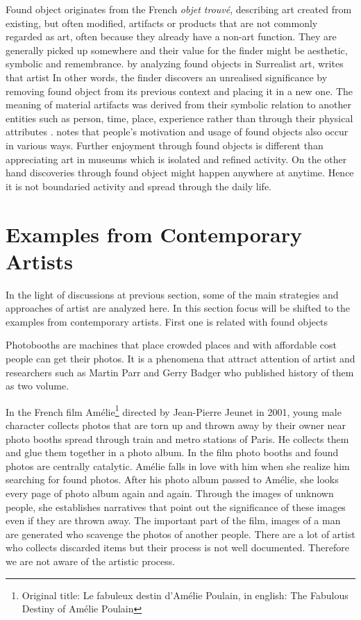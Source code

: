 Found object originates from the French \textit{objet trouvé}, describing art created from existing, but often modified, artifacts or products that are not commonly regarded as art, often because they already have a non-art function. They are generally picked up somewhere and their value for the finder might be aesthetic, symbolic and remembrance. \cite[170]{gascoyne1936short} by analyzing found objects in Surrealist art, writes that artist  In other words, the finder discovers an unrealised significance by removing found object from its previous context and placing it in a new one. The meaning of material artifacts was derived from their symbolic relation to another entities such as person, time, place, experience rather than through their physical attributes \citep{camic2010trashed}. \cite{camic2010trashed} notes that people's motivation and usage of found objects also occur in various ways. Further enjoyment through found objects is different than appreciating art in museums which is isolated and refined activity. On the other hand discoveries through found object might happen anywhere at anytime. Hence it is not boundaried activity and spread through the daily life.



\section{Examples from Contemporary Artists}
In the light of discussions at previous section, some of the main strategies and approaches of artist are analyzed here. In this section focus will be shifted to the examples from contemporary artists. First one is related with found objects

Photobooths are machines that place crowded places and with affordable cost people can get their photos. It is a phenomena that attract attention of artist and researchers such as Martin Parr and Gerry Badger who published history of them as two volume.

In the French film Amélie\footnote{Original title: Le fabuleux destin d'Amélie Poulain, in english: The Fabulous Destiny of Amélie Poulain} directed by Jean-Pierre Jeunet in 2001, young male character collects photos that are torn up and thrown away by their owner near photo booths spread through train and metro stations of Paris. He collects them and glue them together in a photo album. In the film photo booths and found photos are centrally catalytic. Amélie falls in love with him when she realize him searching for found photos. After his photo album passed to Amélie, she looks every page of photo album again and again. Through the images of unknown people, she establishes narratives that point out the significance of these images even if they are thrown away. The important part of the film, images of a man are generated who scavenge the photos of another people. There are a lot of artist who collects discarded items but their process is not well documented. Therefore we are not aware of the artistic process. 

